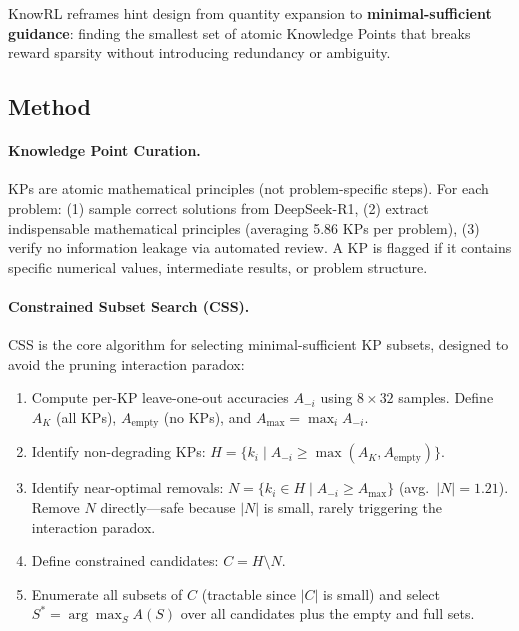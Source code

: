 \documentclass[11pt]{article}
\begin{document}
KnowRL reframes hint design from quantity expansion to \textbf{minimal-sufficient guidance}: finding the smallest set of atomic Knowledge Points that breaks reward sparsity without introducing redundancy or ambiguity.

\subsection{Method}

\paragraph{Knowledge Point Curation.}
KPs are atomic mathematical principles (not problem-specific steps). For each problem: (1) sample correct solutions from DeepSeek-R1, (2) extract indispensable mathematical principles (averaging 5.86 KPs per problem), (3) verify no information leakage via automated review. A KP is flagged if it contains specific numerical values, intermediate results, or problem structure.

\paragraph{Constrained Subset Search (CSS).}
CSS is the core algorithm for selecting minimal-sufficient KP subsets, designed to avoid the pruning interaction paradox:

\begin{enumerate}
    \item Compute per-KP leave-one-out accuracies $A_{-i}$ using $8 \times 32$ samples. Define $A_K$ (all KPs), $A_{\mathrm{empty}}$ (no KPs), and $A_{\mathrm{max}} = \max_i A_{-i}$.

    \item Identify non-degrading KPs: $H = \{k_i \mid A_{-i} \geq \max(A_K, A_{\mathrm{empty}})\}$.

    \item Identify near-optimal removals: $N = \{k_i \in H \mid A_{-i} \geq A_{\mathrm{max}}\}$ (avg.\ $|N| = 1.21$). Remove $N$ directly---safe because $|N|$ is small, rarely triggering the interaction paradox.

    \item Define constrained candidates: $C = H \setminus N$.

    \item Enumerate all subsets of $C$ (tractable since $|C|$ is small) and select $S^{*} = \arg\max_{S} A(S)$ over all candidates plus the empty and full sets.
\end{enumerate}
\end{document}
